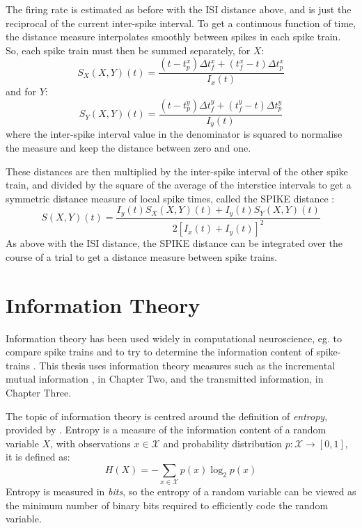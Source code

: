 The firing rate is estimated as before with the ISI distance above, and is just the reciprocal of the current inter-spike interval.  To get a continuous function of time, the distance measure interpolates smoothly between spikes in each spike train. So, each spike train must then be summed separately, for $X$:
\begin{equation}
S_X(X,Y)(t) = \frac{(t-t^x_p)\Delta t^x_f + (t^x_f - t)\Delta t^x_p}{I_x(t)}
\end{equation}
and for $Y$:
\begin{equation}
S_Y(X,Y)(t) = \frac{(t-t^y_p)\Delta t^y_f + (t^y_f - t)\Delta t^y_p}{I_y(t)}
\end{equation}
where the inter-spike interval value in the denominator is squared to normalise the measure and keep the distance between zero and one.

These distances are then multiplied by the inter-spike interval of the other spike train, and divided by the square of the average of the interstice intervals to get a symmetric distance measure of local spike times, called the SPIKE distance \citep{KreuzEtAl2009a}:
\begin{equation}
S(X,Y)(t) =  \frac{I_y(t)S_X(X,Y)(t) + I_y(t)S_Y(X,Y)(t)}{2[I_x(t) + I_y(t)]^2}
\end{equation}
As above with the ISI distance, the SPIKE distance can be integrated over the course of a trial to get a distance measure between spike trains.


\section{Information Theory}
Information theory has been used widely in computational neuroscience, eg. to compare spike trains \citep{BialekEtAl1998a} and to try to determine the information content of spike-trains \citep{GillespieHoughton2009a}. This thesis uses information theory measures such as the incremental mutual information \cite{SinghLesica2010a}, in Chapter Two, and the transmitted information, in Chapter Three.

The topic of information theory is centred around the definition of \emph{entropy}, provided by \citet{Shannon1948a}.  Entropy is a measure of the information content of a random variable $X$, with observations $x \in \mathcal{X}$ and probability distribution $p:\mathcal{X} \rightarrow [0,1]$, it is defined as:
\begin{equation}
H(X) = -\sum_{x\in\mathcal{X}}  p(x) \log_2 p(x)
\end{equation}
Entropy is measured in \emph{bits}, so the entropy of a random variable can be viewed as the minimum number of binary bits required to efficiently code the random variable.

